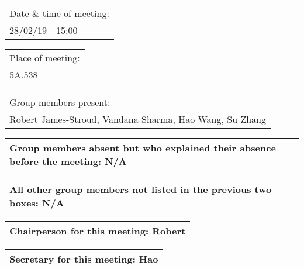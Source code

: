 \documentclass{article}
\begin{document}
\begin{table}[H]
	\centering
	\begin{tabular}{| p{12cm}  |}
	\hline
	Date \& time of meeting: \\ 
	28/02/19 - 15:00 \\ \hline
\end{tabular}
\end{table}

\begin{table}[H]
	\centering
	\begin{tabular}{| p{12cm}  |}
	\hline
	Place of meeting: \\ 
	5A.538 \\ \hline
\end{tabular}
\end{table}

\begin{table}[H]
	\centering
	\begin{tabular}{| p{12cm}  |}
	\hline
	Group members present: \\ 
	Robert James-Stroud, Vandana Sharma, Hao Wang, Su Zhang \\ \hline
\end{tabular}
\end{table}

\begin{table}[H]
	\centering
	\begin{tabular}{| p{12cm}  |}
	\hline
	Group members absent but who explained their absence before the meeting: N/A\\ \hline
\end{tabular}
\end{table}

\begin{table}[H]
	\centering
	\begin{tabular}{| p{12cm}  |}
	\hline
	All other group members not listed in the previous two boxes: N/A\\ \hline
\end{tabular}
\end{table}

\begin{table}[H]
	\centering
	\begin{tabular}{| p{12cm}  |}
	\hline
	Chairperson for this meeting: Robert \\ \hline
\end{tabular}
\end{table}

\begin{table}[H]
	\centering
	\begin{tabular}{| p{12cm}  |}
	\hline
	Secretary for this meeting: Hao \\ \hline
\end{tabular}
\end{table}
\end{document}
